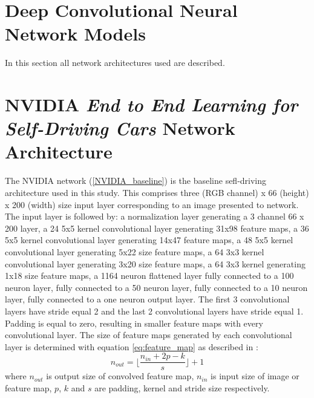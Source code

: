 

\section{Deep Convolutional Neural Network Models}

In this section all network architectures used are described.
\section{NVIDIA \textit{End to End Learning for Self-Driving Cars} Network Architecture}

The NVIDIA network (\ref{NVIDIA_baseline}) is the baseline sefl-driving architecture used in this study. This comprises three (RGB channel) x 66 (height) x 200 (width) size input layer corresponding to an image presented to network. The input layer is followed by: a normalization layer generating a 3 channel 66 x 200 layer, a 24 5x5 kernel convolutional layer generating 31x98 feature maps, a 36 5x5 kernel convolutional layer generating 14x47 feature maps, a 48 5x5 kernel convolutional layer generating 5x22 size feature maps, a 64 3x3 kernel convolutional layer generating 3x20 size feature maps, a 64 3x3 kernel generating 1x18 size feature maps, a 1164 neuron flattened layer fully connected to a 100 neuron layer, fully connected to a 50 neuron layer, fully connected to a 10 neuron layer, fully connected to a one neuron output layer.  
The first 3 convolutional layers have stride equal 2 and the last 2 convolutional layers have stride equal 1. Padding is equal to zero, resulting in smaller feature maps with every convolutional layer.
The size of feature maps generated by each convolutional layer is determined with equation \ref{eq:feature_map} as described in \cite{dumoulin2018guide}:
\begin{equation}
    \label{eq:feature_map}
    n_{out}= \Big\lfloor\frac{n_{in} + 2p -k}{s} \Big\rfloor +1
\end{equation}
where $n_{out}$ is output size of convolved feature map, $n_{in}$ is input size of image or feature map, $p$, $k$ and $s$ are padding, kernel and stride size respectively.  
 
